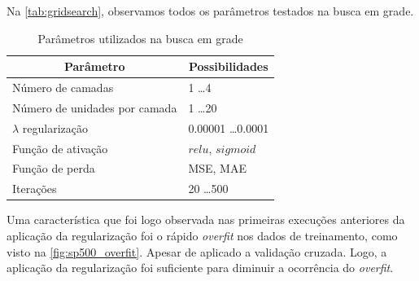 \documentclass[
    12pt,
    oneside,
    a4paper,
    english,
    brazil
]{abntex2}
\begin{document}
Na \autoref{tab:gridsearch}, observamos todos os parâmetros testados na busca em
grade.

\begin{table}[ht]
\centering
\caption{Parâmetros utilizados na busca em grade}\label{tab:gridsearch}
\begin{tabular}{l l}
\multicolumn{1}{c}{Parâmetro}        & \multicolumn{1}{c}{Possibilidades}  \\
    \toprule
    Número de camadas                & 1 \ldots 4                          \\
    Número de unidades por camada    & 1 \ldots 20                         \\
    $\lambda$ regularização          & 0.00001 \ldots 0.0001               \\
    Função de ativação               & $relu$, $sigmoid$                   \\
    Função de perda                  & MSE, MAE                            \\
    Iterações                        & 20 \ldots 500
\end{tabular}
\end{table}

Uma característica  que foi logo  observada nas primeiras  execuções anteriores
da  aplicação  da regularização  foi  o  rápido  \textit{overfit} nos  dados  de
treinamento, como  visto na \autoref{fig:sp500_overfit}. Apesar de aplicado a
validação  cruzada.  Logo, a  aplicação  da  regularização foi  suficiente  para
diminuir a ocorrência do \textit{overfit}.
\end{document}
